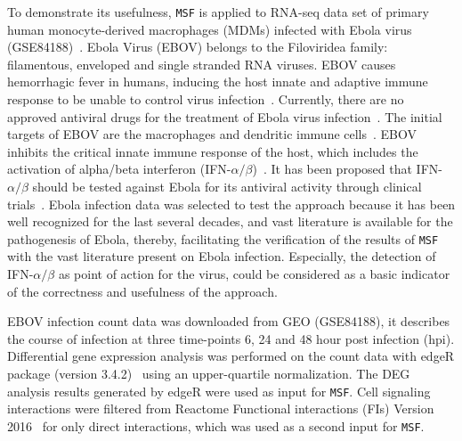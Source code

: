 \documentclass[10pt,a4paper,twocolumn]{article}
\begin{document}
	To demonstrate its usefulness, \texttt{MSF} is applied to
        RNA-seq data set of primary human monocyte-derived macrophages
        (MDMs) infected with Ebola virus
        (GSE84188)~\cite{Olejnik}. Ebola Virus (EBOV) belongs to the
        Filoviridea family: filamentous, enveloped and single stranded
        RNA viruses. EBOV causes hemorrhagic fever in humans, inducing
        the host innate and adaptive immune response to be unable to
        control virus infection~\cite{Prins}. Currently, there are no
        approved antiviral drugs for the treatment of Ebola virus
        infection~\cite{Konde,Rhein}.  The initial targets of EBOV are
        the macrophages and dendritic immune
        cells~\cite{Falasca,Rhein}. EBOV inhibits the critical innate
        immune response of the host, which includes the activation of
        alpha/beta interferon (IFN-$\alpha /
        \beta$)~\cite{Prins,Konde,Cardenas}. It has been proposed that
        IFN-$\alpha / \beta$ should be tested against Ebola for its
        antiviral activity through clinical trials~\cite{Konde}. Ebola
        infection data was selected to test the approach because it
        has been well recognized for the last several decades, and
        vast literature is available for the pathogenesis of Ebola,
        thereby, facilitating the verification of the results of
        \texttt{MSF} with the vast literature present on Ebola
        infection. Especially, the detection of IFN-$\alpha / \beta$
        as point of action for the virus, could be considered as a
        basic indicator of the correctness and usefulness of the
        approach.
	
	EBOV infection count data was downloaded from GEO (GSE84188),
        it describes the course of infection at three time-points 6,
        24 and 48 hour post infection (hpi). Differential gene
        expression analysis was performed on the count data with edgeR
        package (version 3.4.2)~\cite{edgeR} using an upper-quartile
        normalization. The DEG analysis results generated by edgeR
        were used as input for \texttt{MSF}. Cell signaling
        interactions were filtered from Reactome Functional
        interactions (FIs) Version 2016~\cite{Cytokegg} for only
        direct interactions, which was used as a second input for
        \texttt{MSF}.
	
\end{document}
